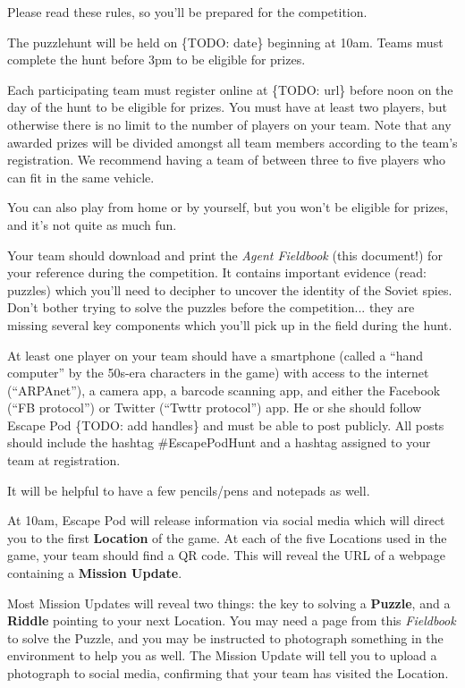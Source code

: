\documentclass{puzzlehunt}
\begin{document}
Please read these rules, so you'll be prepared for the competition.


The puzzlehunt will be held on \{TODO: date\} beginning at 10am. Teams must
complete the hunt before 3pm to be eligible for prizes.


Each participating team must register online at \{TODO: url\} before noon
on the day of the hunt to be eligible for prizes. You must have at least two
players, but otherwise there is no limit to the
number of players on your team. Note that any awarded prizes will be divided amongst
all team members according to the team's registration. We recommend having
a team of between three to five players who can fit in the same vehicle.

You can also play from home or by yourself, but you won't be eligible for prizes, and
it's not quite as much fun.


Your team should download and print the \textit{Agent Fieldbook} (this document!)
for your reference during the competition. It contains important evidence
(read: puzzles) which you'll need to decipher to uncover the identity of the
Soviet spies. Don't bother trying to solve the puzzles before the competition...
they are missing several key components which you'll pick up in the field during
the hunt.

At least one player on your team should have a smartphone (called a
``hand computer'' by the 50s-era characters in the game) with access to the
internet (``ARPAnet''), a camera app, a barcode scanning app, and either
the Facebook (``FB protocol'') or Twitter (``Twttr protocol'') app.
He or she should follow Escape Pod \{TODO: add handles\} and must be able
to post publicly. All posts should include the hashtag \#EscapePodHunt
and a hashtag assigned to your team at registration.

It will be helpful to have a few pencils/pens and notepads as well.


At 10am, Escape Pod will release information via social media which will direct
you to the first \textbf{Location} of the game. At each of the five Locations used
in the game, your team should find a QR code. This will reveal the URL of a
webpage containing a \textbf{Mission Update}.

Most Mission Updates will reveal two things: the key to solving a \textbf{Puzzle},
and a \textbf{Riddle} pointing to your next Location. You may need a page from
this \textit{Fieldbook} to solve the Puzzle, and you may be instructed
to photograph something in the environment to help you as well. The Mission Update
will tell you to upload a photograph to social media, confirming that your team
has visited the Location.
\end{document}
